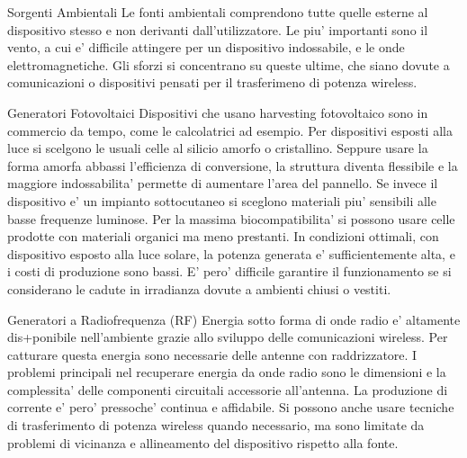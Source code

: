 \begin{section}{Sorgenti Ambientali}
    Le fonti ambientali comprendono tutte quelle esterne al dispositivo stesso e non derivanti dall'utilizzatore. Le piu' importanti sono il vento, a cui e' difficile attingere per un dispositivo indossabile, e le onde elettromagnetiche. Gli sforzi si concentrano su queste ultime, che siano dovute a comunicazioni o dispositivi pensati per il trasferimeno di potenza wireless.
    \begin{subsection}{Generatori Fotovoltaici}
    Dispositivi che usano harvesting fotovoltaico sono in commercio da tempo, come le calcolatrici ad esempio. Per dispositivi esposti alla luce si scelgono le usuali celle al silicio amorfo o cristallino. Seppure usare la forma amorfa abbassi l'efficienza di conversione, la struttura diventa flessibile e la maggiore indossabilita' permette di aumentare l'area del pannello. Se invece il dispositivo e' un impianto sottocutaneo si sceglono materiali piu' sensibili alle basse frequenze luminose. Per la massima biocompatibilita' si possono usare celle prodotte con materiali organici ma meno prestanti. In condizioni ottimali, con dispositivo esposto alla luce solare, la potenza generata e' sufficientemente alta, e i costi di produzione sono bassi. E' pero' difficile garantire il funzionamento se si considerano le cadute in irradianza dovute a ambienti chiusi o vestiti.
    \end{subsection}

    \begin{subsection}{Generatori a Radiofrequenza (RF)}
    Energia sotto forma di onde radio e' altamente dis+ponibile nell'ambiente grazie allo sviluppo delle comunicazioni wireless. Per catturare questa energia sono necessarie delle antenne con raddrizzatore. I problemi principali nel recuperare energia da onde radio sono le dimensioni e la complessita' delle componenti circuitali accessorie all'antenna. La produzione di corrente e' pero' pressoche' continua e affidabile. Si possono anche usare tecniche di trasferimento di potenza wireless quando necessario, ma sono limitate da problemi di vicinanza e allineamento del dispositivo rispetto alla fonte. 
    \end{subsection}
\end{section}

